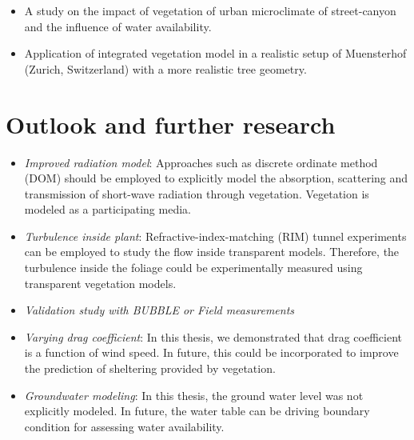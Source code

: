 \begin{itemize}
	\item A study on the impact of vegetation of urban microclimate of street-canyon and the influence of water availability.
	
	\item Application of integrated vegetation model in a realistic setup of Muensterhof (Zurich, Switzerland) with a more realistic tree geometry. 
	
\end{itemize}


\section{Outlook and further research}

\begin{itemize}
	\item \textit{Improved radiation model}: Approaches such as discrete ordinate method (DOM) should be employed to explicitly model the absorption, scattering and transmission of short-wave radiation through vegetation. Vegetation is modeled as a participating media.
	

	\item \textit{Turbulence inside plant}: Refractive-index-matching (RIM) tunnel experiments can be employed to study the flow inside transparent models. Therefore, the turbulence inside the foliage could be experimentally measured using transparent vegetation models.

	\item \textit{Validation study with BUBBLE or Field measurements}
	
	\item \textit{Varying drag coefficient}: In this thesis, we demonstrated that drag coefficient is a function of wind speed. In future, this could be incorporated to improve the prediction of sheltering provided by vegetation. 
	
	\item \textit{Groundwater modeling}: In this thesis, the ground water level was not explicitly modeled. In future, the water table can be driving boundary condition for assessing water availability.


\end{itemize}
